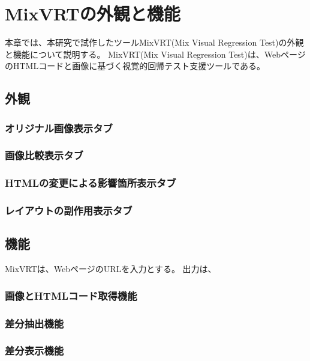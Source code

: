 \chapter{MixVRTの外観と機能}\label{cha:Function}
本章では、本研究で試作したツールMixVRT(Mix Visual Regression Test)の外観と機能について説明する。
MixVRT(Mix Visual Regression Test)は、WebページのHTMLコードと画像に基づく視覚的回帰テスト支援ツールである。


\section{外観}\label{sec:area_detection}



\subsection{オリジナル画像表示タブ}\label{subsec:att}


\subsection{画像比較表示タブ}\label{subsec:a}


\subsection{HTMLの変更による影響箇所表示タブ}\label{subsec:tt}


\subsection{レイアウトの副作用表示タブ}\label{subsec:at}




\section{機能}\label{sec:label_detection}
MixVRTは、WebページのURLを入力とする。
出力は、


\subsection{画像とHTMLコード取得機能}\label{subsec:a1}


\subsection{差分抽出機能}\label{sec:a2}


\subsection{差分表示機能}\label{sec:a3}

